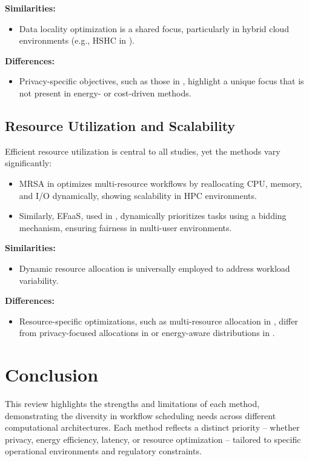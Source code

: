 \documentclass[a4paper, final]{article}
\begin{document}
\noindent \textbf{Similarities:}
\begin{itemize}
    \item Data locality optimization is a shared focus, particularly in hybrid cloud environments 
    (e.g., HSHC in \cite{bib:9}).
\end{itemize}

\noindent \textbf{Differences:}
\begin{itemize}
    \item Privacy-specific objectives, such as those in \cite{bib:7_ppps}, highlight a unique focus that is not 
    present in energy- or cost-driven methods.
\end{itemize}

\subsection{Resource Utilization and Scalability}
Efficient resource utilization is central to all studies, yet the methods vary significantly:
\begin{itemize}
    \item MRSA in \cite{bib:8} optimizes multi-resource workflows by reallocating CPU, memory, 
    and I/O dynamically, showing scalability in HPC environments.
    \item Similarly, EFaaS, used in \cite{bib:4_faas}, dynamically prioritizes tasks using a 
    bidding mechanism, ensuring fairness in multi-user environments.
\end{itemize}

\noindent \textbf{Similarities:}
\begin{itemize}
    \item Dynamic resource allocation is universally employed to address workload variability.
\end{itemize}

\noindent \textbf{Differences:}
\begin{itemize}
    \item Resource-specific optimizations, such as multi-resource allocation in \cite{bib:8}, differ 
    from privacy-focused allocations in \cite{bib:7_ppps} or energy-aware distributions in \cite{bib:5_epee}.
\end{itemize}



\cleardoublepage
{}
\newpage
{}
\section*{Conclusion}
This review highlights the strengths and limitations of each method, demonstrating the diversity in 
workflow scheduling needs across different computational architectures. Each method reflects a distinct
priority -- whether privacy, energy efficiency, latency, or resource optimization -- tailored to specific operational
environments and regulatory constraints.
\end{document}
